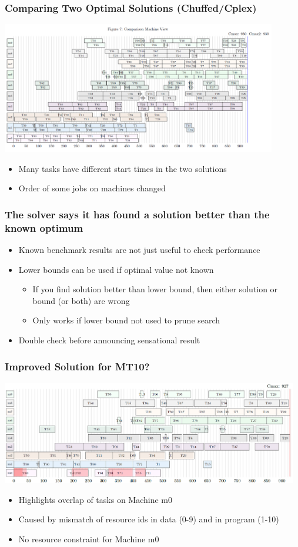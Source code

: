 \documentclass[dvipsnames,aspectratio=169]{beamer}
\begin{document}
\begin{frame}[label=mt10compare]
\frametitle{Comparing Two Optimal Solutions (Chuffed/Cplex)}
\includegraphics[width=12cm]{images/mt10machinecomparison.PNG}
\begin{itemize}
    \item Many tasks have different start times in the two solutions
    \item Order of some jobs on machines changed 
\end{itemize}
\end{frame}


\begin{frame}
\frametitle{The solver says it has found a solution better than the known optimum}
\begin{itemize}
\item Known benchmark results are not just useful to check performance
\item Lower bounds can be used if optimal value not known
\begin{itemize}
    \item If you find solution better than lower bound, then either solution or bound (or both) are wrong 
    \item Only works if lower bound not used to prune search
\end{itemize}
\item Double check before announcing sensational result
\end{itemize}
\end{frame}

\begin{frame}
\frametitle{Improved Solution for MT10?}
\includegraphics[width=13cm]{images/mt10taskoverlap.PNG}
\begin{itemize}
    \item Highlights overlap of tasks on Machine m0
    \item Caused by mismatch of resource ids in data (0-9) and in program (1-10)
    \item No resource constraint for Machine m0
\end{itemize}    
\end{frame}
\end{document}
